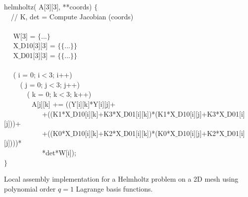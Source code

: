 \begin{algorithm}[t]
\scriptsize
{}

 helmholtz( A[3][3],  **coords) $\lbrace$\\
~~// K, det = Compute Jacobian (coords) \\
~~\\
~~ W[3] = $\lbrace$...$\rbrace$\\
~~ X$\_$D10[3][3] = $\lbrace\lbrace$...$\rbrace\rbrace$\\
~~ X$\_$D01[3][3] = $\lbrace\lbrace$...$\rbrace\rbrace$\\
~~\\
~~ ( i = 0; i$<$3; i++) \\
~~~~ ( j = 0; j$<$3; j++) \\
~~~~~~ ( k = 0; k$<$3; k++) \\
~~~~~~~~A[j][k] += ((Y[i][k]*Y[i][j]+\\
~~~~~~~~~~~+((K1*X$\_$D10[i][k]+K3*X$\_$D01[i][k])*(K1*X$\_$D10[i][j]+K3*X$\_$D01[i][j]))+\\
~~~~~~~~~~~+((K0*X$\_$D10[i][k]+K2*X$\_$D01[i][k])*(K0*X$\_$D10[i][j]+K2*X$\_$D01[i][j])))*\\
~~~~~~~~~~~*det*W[i]);\\
$\rbrace$
\caption{Local assembly implementation for a Helmholtz problem on a 2D mesh using polynomial order $q=1$ Lagrange basis functions.}
\label{code:helmholtz}
\end{algorithm}

